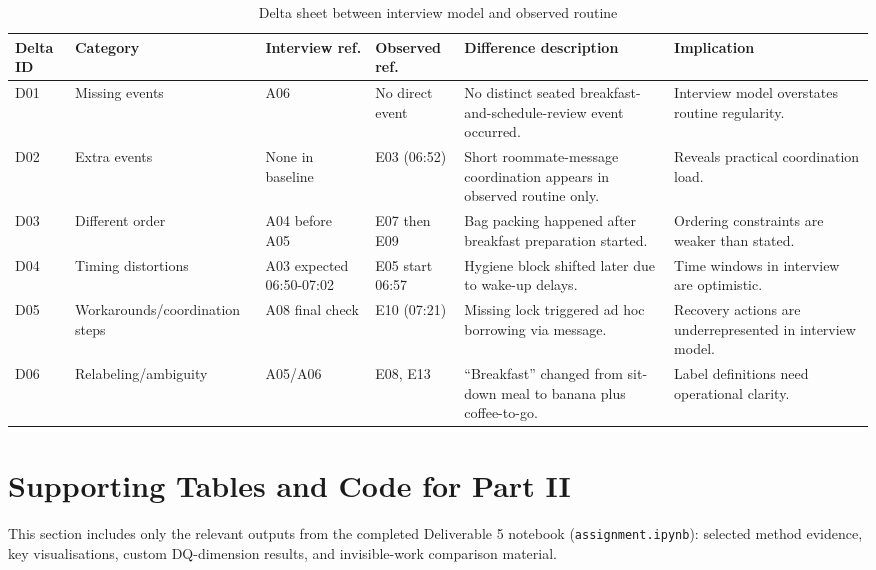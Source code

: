 \begin{table}[H]
\centering
\footnotesize
\caption{Delta sheet between interview model and observed routine}
\label{tab:d3_delta_sheet}
\begin{tabularx}{\textwidth}{
>{\raggedright\arraybackslash}p{}
>{\raggedright\arraybackslash}p{}
>{\raggedright\arraybackslash}p{}
>{\raggedright\arraybackslash}p{}
>{\raggedright\arraybackslash}X
>{\raggedright\arraybackslash}p{}
}
\toprule
Delta ID & Category & Interview ref. & Observed ref. & Difference description & Implication \\
\midrule
D01 & Missing events & A06 & No direct event & No distinct seated breakfast-and-schedule-review event occurred. & Interview model overstates routine regularity. \\
D02 & Extra events & None in baseline & E03 (06:52) & Short roommate-message coordination appears in observed routine only. & Reveals practical coordination load. \\
D03 & Different order & A04 before A05 & E07 then E09 & Bag packing happened after breakfast preparation started. & Ordering constraints are weaker than stated. \\
D04 & Timing distortions & A03 expected 06:50-07:02 & E05 start 06:57 & Hygiene block shifted later due to wake-up delays. & Time windows in interview are optimistic. \\
D05 & Workarounds/coordination steps & A08 final check & E10 (07:21) & Missing lock triggered ad hoc borrowing via message. & Recovery actions are underrepresented in interview model. \\
D06 & Relabeling/ambiguity & A05/A06 & E08, E13 & ``Breakfast'' changed from sit-down meal to banana plus coffee-to-go. & Label definitions need operational clarity. \\
\bottomrule
\end{tabularx}
\end{table}

\section{Supporting Tables and Code for Part II}
\label{app:part2_supporting}

This section includes only the relevant outputs from the completed Deliverable 5 notebook (\texttt{assignment.ipynb}): selected method evidence, key visualisations, custom DQ-dimension results, and invisible-work comparison material.

